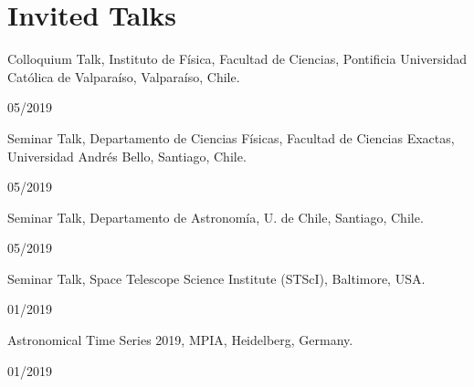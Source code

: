 \documentclass[12pt, a4paper]{article} %
\begin{document}
\section*{Invited Talks}
\begin{minipage}[t]{0.7\textwidth}
\begin{flushleft}%
  \setlength{\leftskip}{0.2cm}%
Colloquium Talk, Instituto de F\'isica, Facultad de Ciencias, Pontificia Universidad Cat\'olica de Valpara\'iso, Valpara\'iso, Chile.
\end{flushleft}
\end{minipage}
\begin{minipage}[t]{0.3\textwidth}
\hfill 05/2019
\end{minipage}

\begin{minipage}[t]{0.7\textwidth}
\begin{flushleft}%
  \setlength{\leftskip}{0.2cm}%
Seminar Talk, Departamento de Ciencias F\'isicas, Facultad de Ciencias
Exactas, Universidad Andr\'es Bello, Santiago, Chile.
\end{flushleft}
\end{minipage}
\begin{minipage}[t]{0.3\textwidth}
\hfill 05/2019
\end{minipage}


\begin{minipage}[t]{0.7\textwidth}
\begin{flushleft}%
  \setlength{\leftskip}{0.2cm}%
Seminar Talk, Departamento de Astronom\'ia, U. de Chile, Santiago, Chile.
\end{flushleft}
\end{minipage}
\begin{minipage}[t]{0.3\textwidth}
\hfill 05/2019
\end{minipage}

\begin{minipage}[t]{0.7\textwidth}
\begin{flushleft}%
  \setlength{\leftskip}{0.2cm}%
Seminar Talk, Space Telescope Science Institute (STScI), Baltimore, USA.
\end{flushleft}
\end{minipage}
\begin{minipage}[t]{0.3\textwidth}
\hfill 01/2019
\end{minipage}

\begin{minipage}[t]{0.7\textwidth}
\begin{flushleft}%
  \setlength{\leftskip}{0.2cm}%
Astronomical Time Series 2019, MPIA, Heidelberg, Germany.
\end{flushleft}
\end{minipage}
\begin{minipage}[t]{0.3\textwidth}
\hfill 01/2019
\end{minipage}
\end{document}
